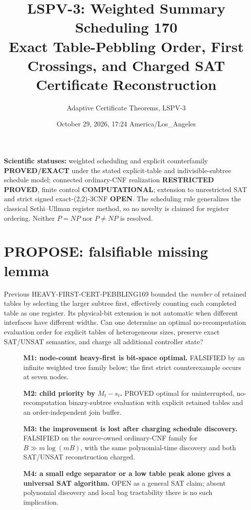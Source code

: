 \documentclass[11pt]{article}
\title{LSPV-3: Weighted Summary Scheduling 170\\\large Exact Table-Pebbling Order, First Crossings, and Charged SAT Certificate Reconstruction}
\author{Adaptive Certificate Theorems, LSPV-3}
\date{October 29, 2026, 17:24 America/Los\_Angeles}
\begin{document}
\maketitle
\noindent\textbf{Scientific statuses:} weighted scheduling and explicit counterfamily \textbf{PROVED/EXACT} under the stated explicit-table and indivisible-subtree schedule model; connected ordinary-CNF realization \textbf{RESTRICTED PROVED}, finite control \textbf{COMPUTATIONAL}; extension to unrestricted SAT and strict signed exact-(2,2)-3CNF \textbf{OPEN}. The scheduling rule generalizes the classical Sethi--Ullman register method, so no novelty is claimed for register ordering. Neither $P=NP$ nor $P\ne NP$ is resolved.

\section{PROPOSE: falsifiable missing lemma}
Previous HEAVY-FIRST-CERT-PEBBLING169 bounded the \emph{number} of retained tables by selecting the larger subtree first, effectively counting each completed table as one register. Its physical-bit extension is not automatic when different interfaces have different widths. Can one determine an optimal no-recomputation evaluation order for explicit tables of heterogeneous sizes, preserve exact SAT/UNSAT semantics, and charge all additional controller state?
\begin{description}
\item[]\textbf{M1: node-count heavy-first is bit-space optimal.} FALSIFIED by an infinite weighted tree family below; the first strict counterexample occurs at seven nodes.
\item[]\textbf{M2: child priority by $M_t-s_t$.} PROVED optimal for uninterrupted, no-recomputation binary-subtree evaluation with explicit retained tables and an order-independent join buffer.
\item[]\textbf{M3: the improvement is lost after charging schedule discovery.} FALSIFIED on the source-owned ordinary-CNF family for $B\gg m\log(mB)$, with the same polynomial-time discovery and both SAT/UNSAT reconstruction charged.
\item[]\textbf{M4: a small edge separator or a low table peak alone gives a universal SAT algorithm.} OPEN as a general SAT claim; absent polynomial discovery and local bag tractability there is no such implication.
\end{description}
\end{document}
